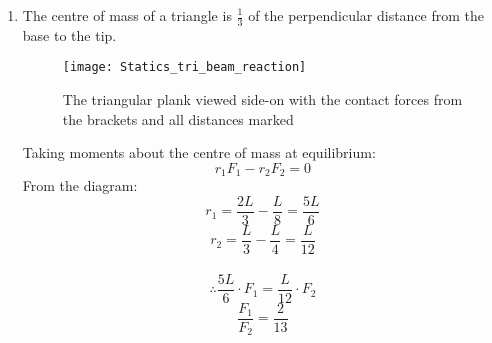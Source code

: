 \begin{hint}[AO1989PIQ3a]
{\begin{enumerate}
	\item The centre of mass of a triangle is $\frac{1}{3}$ of the perpendicular distance from the base to the tip.
\begin{figure}[htbp]
	\centering
	\texttt{[image: Statics\_tri\_beam\_reaction]}
	\caption{The triangular plank viewed side-on with the contact forces from the brackets and all distances marked}
	\label{fig:Statics_tri_beam_reaction}
\end{figure}

Taking moments about the centre of mass at equilibrium:
\begin{equation*}
r_1F_1-r_2F_2=0
\end{equation*}
From the diagram:
\begin{equation*}
r_1=\frac{2L}{3}-\frac{L}{8}=\frac{5L}{6} 
\end{equation*}
\begin{equation*}
r_2=\frac{L}{3}-\frac{L}{4}=\frac{L}{12} 
\end{equation*}
\\
\begin{equation*}
\therefore \frac{5L}{6} \cdot F_1 = \frac{L}{12} \cdot F_2 
\end{equation*}
\begin{equation*} 
\frac{F_1}{F_2}=\frac{2}{13}
\end{equation*}


\end{enumerate}
}
\end{hint}
